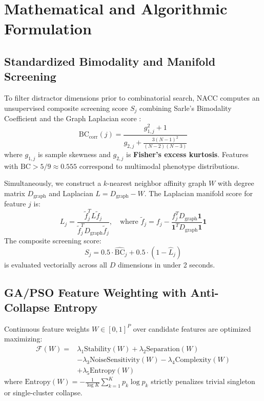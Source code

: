 \documentclass[journal]{IEEEtran}
\begin{document}
\section{Mathematical and Algorithmic Formulation}

\subsection{Standardized Bimodality and Manifold Screening}
To filter distractor dimensions prior to combinatorial search, NACC computes an unsupervised composite screening score $S_j$ combining Sarle's Bimodality Coefficient \cite{sarle1983sas} and the Graph Laplacian score \cite{he2005laplacian}:
\begin{equation}
\text{BC}_{\text{corr}}(j) = \frac{g_{1, j}^2 + 1}{g_{2, j} + \frac{3(N-1)^2}{(N-2)(N-3)}}
\end{equation}
where $g_{1, j}$ is sample skewness and $g_{2, j}$ is \textbf{Fisher's excess kurtosis}. Features with $\text{BC} > 5/9 \approx 0.555$ correspond to multimodal phenotype distributions.

Simultaneously, we construct a $k$-nearest neighbor affinity graph $W$ with degree matrix $D_{\text{graph}}$ and Laplacian $L = D_{\text{graph}} - W$. The Laplacian manifold score for feature $j$ is:
\begin{equation}
L_j = \frac{\tilde{f}_j^T L \tilde{f}_j}{\tilde{f}_j^T D_{\text{graph}} \tilde{f}_j}, \quad \text{where } \tilde{f}_j = f_j - \frac{f_j^T D_{\text{graph}} \mathbf{1}}{\mathbf{1}^T D_{\text{graph}} \mathbf{1}} \mathbf{1}
\end{equation}
The composite screening score:
\begin{equation}
S_j = 0.5 \cdot \widehat{\text{BC}}_j + 0.5 \cdot (1 - \widehat{L}_j)
\end{equation}
is evaluated vectorially across all $D$ dimensions in under 2 seconds.

\subsection{GA/PSO Feature Weighting with Anti-Collapse Entropy}
Continuous feature weights $W \in [0, 1]^P$ over candidate features are optimized maximizing:
\begin{align}
\mathcal{F}(W) = &\lambda_1 \text{Stability}(W) + \lambda_2 \text{Separation}(W) \nonumber \\
&- \lambda_3 \text{NoiseSensitivity}(W) - \lambda_4 \text{Complexity}(W) \nonumber \\
&+ \lambda_5 \text{Entropy}(W)
\end{align}
where $\text{Entropy}(W) = -\frac{1}{\log K} \sum_{k=1}^K p_k \log p_k$ strictly penalizes trivial singleton or single-cluster collapse.
\end{document}
